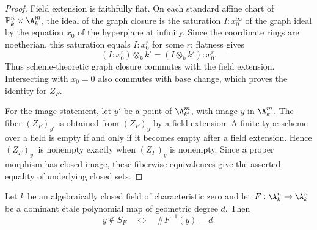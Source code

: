 \begin{proof}
Field extension is faithfully flat.  On each standard affine chart of
\(\mathbb P^n_k\times\A^m_k\), the ideal of the graph closure is the
saturation \(I:x_0^\infty\) of the graph ideal by the equation \(x_0\) of
the hyperplane at infinity.  Since the coordinate rings are noetherian, this
saturation equals \(I:x_0^r\) for some \(r\); flatness gives
\[
 (I:x_0^r)\otimes_k k'=(I\otimes_k k'):x_0^r.
\]
Thus scheme-theoretic graph closure commutes with the field extension.
Intersecting with \(x_0=0\) also commutes with base change, which proves the
identity for \(Z_F\).

For the image statement, let \(y'\) be a point of \(\A^m_{k'}\), with image
\(y\) in \(\A^m_k\).  The fiber \((Z_F)_{y'}\) is obtained from
\((Z_F)_y\) by a field extension.  A finite-type scheme over a field is
empty if and only if it becomes empty after a field extension.  Hence
\((Z_F)_{y'}\) is nonempty exactly when \((Z_F)_y\) is nonempty.  Since a
proper morphism has closed image, these fiberwise equivalences give the
asserted equality of underlying closed sets.
\end{proof}

\begin{lemma}
\label{lem:properness-cardinality}
Let \(k\) be an algebraically closed field of characteristic zero and let
\(F:\A^n_k\to\A^n_k\) be a dominant \'etale polynomial map of geometric
degree \(d\).  Then
\begin{equation}
 y\notin S_F\quad\Longleftrightarrow\quad
 \#F^{-1}(y)=d.
 \label{eq:properness-cardinality}
\end{equation}
\end{lemma}

